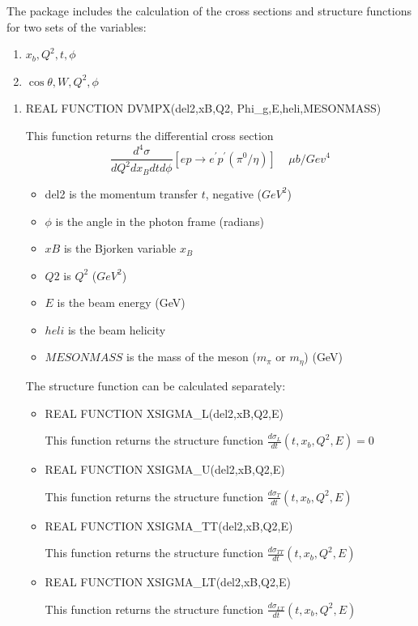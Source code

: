 \documentclass[prc,floatfix,superscriptaddress]{revtex4}
\begin{document}
The package includes the calculation of the cross sections and structure functions  for two sets of the variables:
\begin{enumerate}
\item $x_b,Q^2,t,\phi$
\item $\cos\theta,W,Q^2,\phi$
\end{enumerate}




\begin{enumerate} 
\item     REAL FUNCTION DVMPX(del2,xB,Q2, Phi\_g,E,heli,MESONMASS)

This function returns the differential cross section 
$$
\frac{d^4 \sigma}{dQ^2 dx_B dt d\phi} [{ep \rightarrow e^\prime p^\prime (\pi^0/\eta)}]\ \ \ \ \ \mu b/Gev^4
$$
         \begin {itemize}
                  \item del2 is the  momentum transfer $t$, negative ($GeV^2$)
                  \item $\phi$ is the  angle in the photon frame (radians)
                  \item $xB$ is the Bjorken variable $x_B$
                  \item $Q2$ is  $Q^2$ ($GeV^2$)
                  \item $E$  is the  beam energy (GeV)
                  \item $heli$ is the  beam helicity
                  \item $ MESONMASS$ is the mass of the meson ($m_\pi$ or $m_\eta$) (GeV)
         \end{itemize}
The structure function can be calculated separately:
\begin{itemize}
\item         REAL FUNCTION XSIGMA\_L(del2,xB,Q2,E)

This function returns the structure function $\frac{d\sigma_L}{dt}(t,x_b,Q^2,E)=0$
\item         REAL FUNCTION XSIGMA\_U(del2,xB,Q2,E)

This function returns the structure function $\frac{d\sigma_T}{dt}(t,x_b,Q^2,E)$
\item         REAL FUNCTION XSIGMA\_TT(del2,xB,Q2,E)

This function returns the structure function $\frac{d\sigma_{TT}}{dt}(t,x_b,Q^2,E)$
\item         REAL FUNCTION XSIGMA\_LT(del2,xB,Q2,E)

This function returns the structure function $\frac{d\sigma_{LT}}{dt}(t,x_b,Q^2,E)$
\end{itemize}



\end{enumerate}
\end{document}
